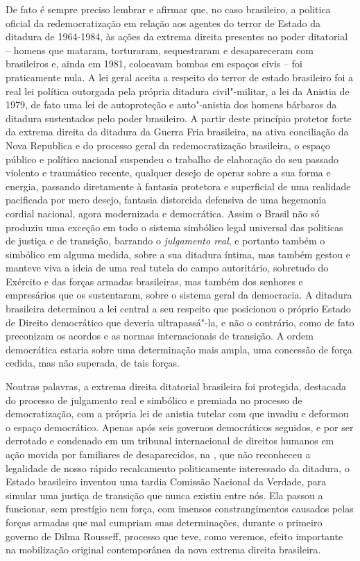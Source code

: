 De fato é sempre preciso lembrar e afirmar que, no caso brasileiro, a
politica oficial da redemocratização em relação aos agentes do terror de
Estado da ditadura de 1964-1984, às ações da extrema direita presentes
no poder ditatorial -- homens que mataram, torturaram, sequestraram e
desapareceram com brasileiros e, ainda em 1981, colocavam bombas em
espaços civis -- foi praticamente nula. A lei geral aceita a respeito do
terror de estado brasileiro foi a real lei política outorgada pela
própria ditadura civil"-militar, a lei da Anistia de 1979, de fato uma
lei de autoproteção e auto"-anistia dos homens bárbaros da ditadura
sustentados pelo poder brasileiro. A partir deste princípio protetor
forte da extrema direita da ditadura da Guerra Fria brasileira, na ativa
conciliação da Nova Republica e do processo geral da redemocratização
brasileira, o espaço público e político nacional suspendeu o trabalho de
elaboração do seu passado violento e traumático recente, qualquer desejo
de operar sobre a sua forma e energia, passando diretamente à fantasia
protetora e superficial de uma realidade pacificada por mero desejo,
fantasia distorcida defensiva de uma hegemonia cordial nacional, agora
modernizada e democrática. Assim o Brasil não só produziu uma exceção em
todo o sistema simbólico legal universal das politicas de justiça e de
transição, barrando o \emph{julgamento real}, e portanto também o
simbólico em alguma medida, sobre a sua ditadura íntima, mas também
gestou e manteve viva a ideia de uma real tutela do campo autoritário,
sobretudo do Exército e das forças armadas brasileiras, mas também dos
senhores e empresários que os sustentaram, sobre o sistema geral da
democracia. A ditadura brasileira determinou a lei central a seu
respeito que posicionou o próprio Estado de Direito democrático que
deveria ultrapassá"-la, e não o contrário, como de fato preconizam os
acordos e as normas internacionais de transição. A ordem democrática
estaria sobre uma determinação mais ampla, uma concessão de força
cedida, mas não superada, de tais forças.

Noutras palavras, a extrema direita ditatorial brasileira foi protegida,
destacada do processo de julgamento real e simbólico e premiada no
processo de democratização, com a própria lei de anistia tutelar com que
invadiu e deformou o espaço democrático. Apenas após seis governos
democráticos seguidos, e por ser derrotado e condenado em um tribunal
internacional de direitos humanos em ação movida por familiares de
desaparecidos, na , que não reconheceu a legalidade de nosso rápido
recalcamento politicamente interessado da ditadura, o Estado brasileiro
inventou uma tardia Comissão Nacional da Verdade, para simular uma
justiça de transição que nunca existiu entre nós. Ela passou a
funcionar, sem prestígio nem força, com imensos constrangimentos
causados pelas forças armadas que mal cumpriam suas determinações,
durante o primeiro governo de Dilma Rousseff, processo que teve, como
veremos, efeito importante na mobilização original contemporânea da nova
extrema direita brasileira.

